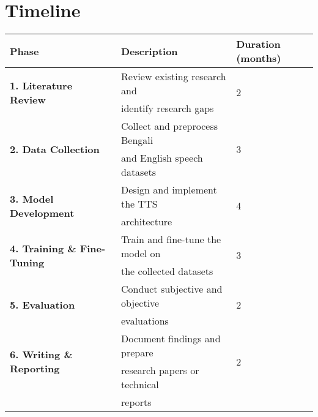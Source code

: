 \section*{ Timeline}

\begin{table}[h!]
    \centering
    \begin{tabular}{lll}


    \toprule
    \textbf{Phase} & \textbf{Description} & \textbf{Duration (months)} \\
    \midrule
    \multirow{2}{*}{\textbf{1. Literature Review}} & Review existing research and & \multirow{2}{*}{2} \\
     & identify research gaps &  \\
     
    
     \midrule
    \multirow{2}{*}{\textbf{2. Data Collection}} & Collect and preprocess Bengali & \multirow{2}{*}{3} \\
     & and English speech datasets & \\
    
     \midrule
    \multirow{2}{*}{\textbf{3. Model Development}} & Design and implement the TTS & \multirow{2}{*}{4} \\
     & architecture &  \\

    \midrule
    \multirow{2}{*}{\textbf{4. Training \& Fine-Tuning}} & Train and fine-tune the model on & \multirow{2}{*}{3} \\
     & the collected datasets & \\
    
    \midrule
    \multirow{2}{*}{\textbf{5. Evaluation}} & Conduct subjective and objective & \multirow{2}{*}{2} \\
     & evaluations & \\
    
    \midrule
    \multirow{2}{*}{\textbf{6. Writing \& Reporting}} & Document findings and prepare & \multirow{2}{*}{2} \\
     & research papers or technical & \\
     & reports & \\
    \bottomrule
    \end{tabular}
\end{table}



